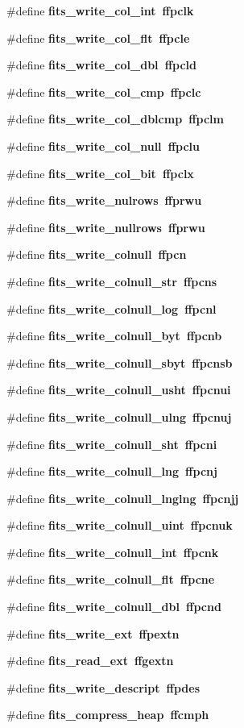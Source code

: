 \begin{CompactItemize}
\#define \bf{fits\_\-write\_\-col\_\-int}~ffpclk
\item 
\#define \bf{fits\_\-write\_\-col\_\-flt}~ffpcle
\item 
\#define \bf{fits\_\-write\_\-col\_\-dbl}~ffpcld
\item 
\#define \bf{fits\_\-write\_\-col\_\-cmp}~ffpclc
\item 
\#define \bf{fits\_\-write\_\-col\_\-dblcmp}~ffpclm
\item 
\#define \bf{fits\_\-write\_\-col\_\-null}~ffpclu
\item 
\#define \bf{fits\_\-write\_\-col\_\-bit}~ffpclx
\item 
\#define \bf{fits\_\-write\_\-nulrows}~ffprwu
\item 
\#define \bf{fits\_\-write\_\-nullrows}~ffprwu
\item 
\#define \bf{fits\_\-write\_\-colnull}~ffpcn
\item 
\#define \bf{fits\_\-write\_\-colnull\_\-str}~ffpcns
\item 
\#define \bf{fits\_\-write\_\-colnull\_\-log}~ffpcnl
\item 
\#define \bf{fits\_\-write\_\-colnull\_\-byt}~ffpcnb
\item 
\#define \bf{fits\_\-write\_\-colnull\_\-sbyt}~ffpcnsb
\item 
\#define \bf{fits\_\-write\_\-colnull\_\-usht}~ffpcnui
\item 
\#define \bf{fits\_\-write\_\-colnull\_\-ulng}~ffpcnuj
\item 
\#define \bf{fits\_\-write\_\-colnull\_\-sht}~ffpcni
\item 
\#define \bf{fits\_\-write\_\-colnull\_\-lng}~ffpcnj
\item 
\#define \bf{fits\_\-write\_\-colnull\_\-lnglng}~ffpcnjj
\item 
\#define \bf{fits\_\-write\_\-colnull\_\-uint}~ffpcnuk
\item 
\#define \bf{fits\_\-write\_\-colnull\_\-int}~ffpcnk
\item 
\#define \bf{fits\_\-write\_\-colnull\_\-flt}~ffpcne
\item 
\#define \bf{fits\_\-write\_\-colnull\_\-dbl}~ffpcnd
\item 
\#define \bf{fits\_\-write\_\-ext}~ffpextn
\item 
\#define \bf{fits\_\-read\_\-ext}~ffgextn
\item 
\#define \bf{fits\_\-write\_\-descript}~ffpdes
\item 
\#define \bf{fits\_\-compress\_\-heap}~ffcmph
\item 

\end{CompactItemize}
